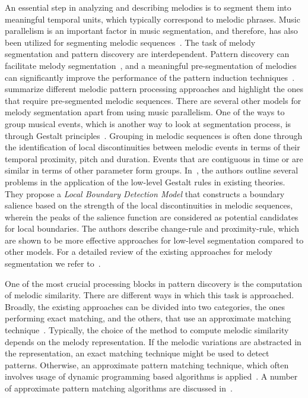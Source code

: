An essential step in analyzing and describing melodies is to segment them into meaningful temporal units, which typically correspond to melodic phrases. Music parallelism is an important factor in music segmentation, and therefore, has also been utilized for segmenting melodic sequences~\citep{Cambouropoulos2006}. The task of melody segmentation and pattern discovery are interdependent. Pattern discovery can facilitate melody segmentation~\citep{Cambouropoulos2006}, and a meaningful pre-segmentation of melodies can significantly improve the performance of the pattern induction techniques~\citep{hiraga1997structural}. \cite{cambouropoulos2001pattern} summarize different melodic pattern processing approaches and highlight the ones that require pre-segmented melodic sequences. There are several other models for melody segmentation apart from using music parallelism. One of the ways to group musical events, which is another way to look at segmentation process, is through Gestalt principles~\citep{Lerdahl1983,tenney1980temporal}. Grouping in melodic sequences is often done through the identification of local discontinuities between melodic events in terms of their temporal proximity, pitch and duration. Events that are contiguous in time or are similar in terms of other parameter form groups. In~\cite{cambouropoulos1996formal,cambouropoulos2001local}, the authors outline several problems in the application of the low-level Gestalt rules in existing theories. They propose a \textit{Local Boundary Detection Model} that constructs a boundary salience based on the strength of the local discontinuities in melodic sequences, wherein the peaks of the salience function are considered as potential candidates for local boundaries. The authors describe change-rule and proximity-rule, which are shown to be more effective approaches for low-level segmentation compared to other models. For a detailed review of the existing approaches for melody segmentation we refer to~\cite{cambouropoulos2001pattern}.

One of the most crucial processing blocks in pattern discovery is the computation of melodic similarity. There are different ways in which this task is approached. Broadly, the existing approaches can be divided into two categories, the ones performing exact matching, and the others, that use an approximate matching technique~\citep{cambouropoulos2001pattern}. Typically, the choice of the method to compute melodic similarity depends on the melody representation. If the melodic variations are abstracted in the representation, an exact matching technique might be used to detect patterns. Otherwise, an approximate pattern matching technique, which often involves usage of dynamic programming based algorithms is applied~\citep{rolland1999discovering}. A number of approximate pattern matching algorithms are discussed in~. 


